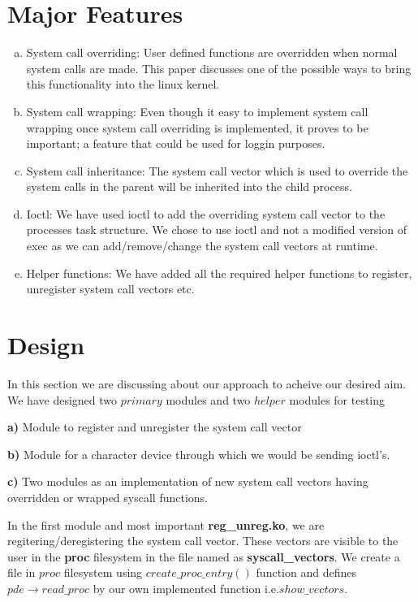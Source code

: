 \documentclass[11pt]{article}
\begin{document}
\section{Major Features}

\begin{enumerate}[(a)]

\item
System call overriding: User defined functions are overridden when normal system calls are made. This paper discusses one of the possible ways to bring this functionality into the linux kernel. 

\item
System call wrapping: Even though it easy to implement system call wrapping once system call overriding is implemented, it proves to be important; a feature that could be used for loggin purposes. 

\item
System call inheritance: The system call vector which is used to override the system calls in the parent will be inherited into the child process.
 
\item
Ioctl: We have used ioctl to add the overriding system call vector to the processes task structure. We chose to use ioctl and not a modified version of exec as we can add/remove/change the system call vectors at runtime. 

\item
Helper functions: We have added all the required helper functions to register, unregister system call vectors etc. 

\end{enumerate}

\section{Design}

In this section we are discussing about our approach to acheive our desired aim. We have designed two $primary$ modules and 
two $helper$ modules for testing

\medskip
\noindent
\textbf{a)} Module to register and unregister the system call vector

\noindent
\textbf{b)} Module for a character device through which we would be sending ioctl's.


\noindent
\textbf{c)}  Two modules as an implementation of new system call vectors having overridden or wrapped syscall functions.


\medskip
\noindent
In the first module and most important \textbf{reg\_unreg.ko}, we are regitering/deregistering the system call vector. These vectors are visible to the user in the
\textbf{proc} filesystem in the file named as \textbf{syscall\_vectors}. We create a file in $proc$ filesystem using 
$create\_proc\_entry()$ function and defines $pde \rightarrow read\_proc$ by our own implemented function i.e.$show\_vectors$.
\end{document}
